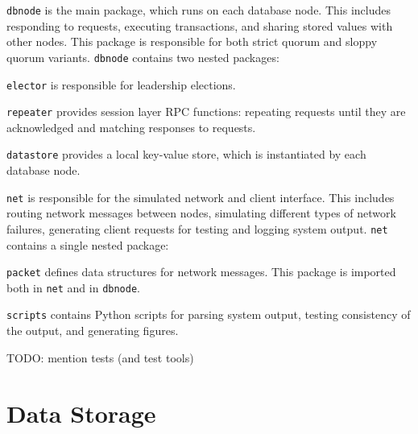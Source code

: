 \documentclass[12pt,a4paper,twoside,openany]{report}
\begin{document}
\begin{description}
  \item{\verb|dbnode|} is the main package, which runs on each database node. This includes responding to requests, executing transactions, and sharing stored values with other nodes. This package is responsible for both strict quorum and sloppy quorum variants. \verb|dbnode| contains two nested packages:

  \begin{description}
    \item{\verb|elector|} is responsible for leadership elections.

    \item{\verb|repeater|} provides session layer RPC functions: repeating requests until they are acknowledged and matching responses to requests.

  \end{description}

  \item{\verb|datastore|} provides a local key-value store, which is instantiated by each database node.

  \item{\verb|net|} is responsible for the simulated network and client interface. This includes routing network messages between nodes, simulating different types of network failures, generating client requests for testing and logging system output. \verb|net| contains a single nested package:

  \begin{description}
    \item
    \item{\verb|packet|} defines data structures for network messages. This package is imported both in \verb|net| and in \verb|dbnode|.

  \end{description}

  \item{\verb|scripts|} contains Python scripts for parsing system output, testing consistency of the output, and generating figures.

\end{description}


TODO: mention tests (and test tools)

\section{Data Storage}
\end{document}

